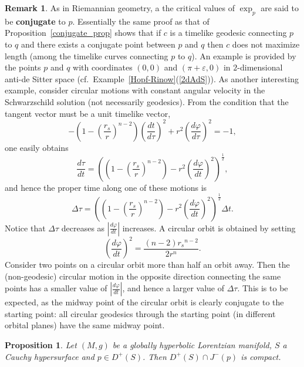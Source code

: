 \documentclass[10pt]{amsart}
\newtheorem{Prop}[Thm]{Proposition}
\theoremstyle{definition}
\newtheorem{Remark}[Thm]{Remark}
\theoremstyle{remark}
\begin{document}
\begin{Remark}
As in Riemannian geometry, a the critical values of $\exp_p$ are said to be {\bf conjugate} to $p$. Essentially the same proof as that of Proposition~\ref{conjugate_prop} shows that if $c$ is a timelike geodesic connecting $p$ to $q$ and there exists a conjugate point between $p$ and $q$ then $c$ does not maximize length (among the timelike curves connecting $p$ to $q$). An example is provided by the points $p$ and $q$ with coordinates $(0,0)$ and $(\pi + \varepsilon, 0)$ in $2$-dimensional anti-de Sitter space (cf.~Example~\ref{Hopf-Rinow}(\ref{2dAdS})). As another interesting example, consider circular motions with constant angular velocity in the Schwarzschild solution (not necessarily geodesics). From the condition that the tangent vector must be a unit timelike vector,
\[
- \left( 1 - \left(\frac{r_s}{r}\right)^{n-2} \right) \left(\frac{dt}{d\tau}\right)^2 + r^2 \left(\frac{d\varphi}{d\tau}\right)^2 = -1,
\]
one easily obtains
\[
\frac{d\tau}{dt} = \left(\left( 1 - \left(\frac{r_s}{r}\right)^{n-2} \right) - r^2 \left(\frac{d\varphi}{dt}\right)^2\right)^{\frac12},
\]
and hence the proper time along one of these motions is
\[
\Delta \tau =  \left(\left( 1 - \left(\frac{r_s}{r}\right)^{n-2} \right) - r^2 \left(\frac{d\varphi}{dt}\right)^2\right)^{\frac12} \Delta t.
\] 
Notice that $\Delta \tau$ decreases as $\left|\frac{d\varphi}{dt}\right|$ increases. A circular orbit is obtained by setting
\[
\left( \frac{d\varphi}{dt} \right)^2 = \frac{(n-2){r_s}^{n-2}}{2r^n}.
\]
Consider two points on a circular orbit more than half an orbit away. Then the (non-geodesic) circular motion in the opposite direction connecting the same points has a smaller value of $\left|\frac{d\varphi}{dt}\right|$, and hence a larger value of $\Delta \tau$. This is to be expected, as the midway point of the circular orbit is clearly conjugate to the starting point: all circular geodesics through the starting point (in different orbital planes) have the same midway point.
\end{Remark}

\begin{Prop} \label{compact_prop}
Let $(M,g)$ be a globally hyperbolic Lorentzian manifold, $S$ a Cauchy hypersurface and $p \in D^+(S)$. Then $D^+(S)\cap J^-(p)$ is compact.
\end{Prop}
\end{document}
